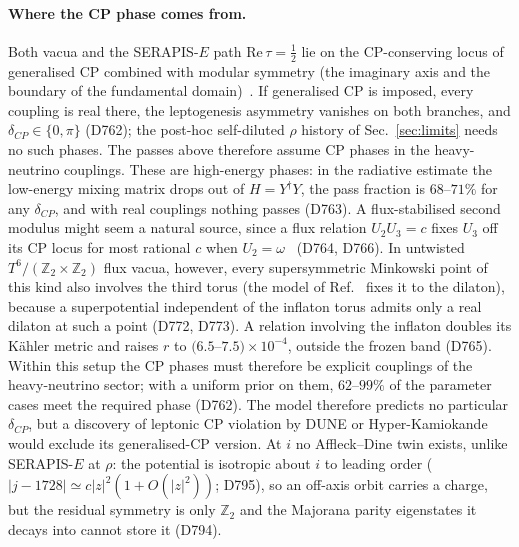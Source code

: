 \documentclass[aps,prd,twocolumn,superscriptaddress,nofootinbib,floatfix]{revtex4-2}
\begin{document}
\paragraph{Where the CP phase comes from.} Both vacua and the SERAPIS-$E$ path $\mathrm{Re}\,\tau=\tfrac12$ lie on the CP-conserving locus of generalised CP combined with modular symmetry (the imaginary axis and the boundary of the fundamental domain)~\cite{arXiv_1905_11970}. If generalised CP is imposed, every coupling is real there, the leptogenesis asymmetry vanishes on both branches, and $\delta_{CP}\in\{0,\pi\}$ (D762); the post-hoc self-diluted $\rho$ history of Sec.~\ref{sec:limits} needs no such phases. The passes above therefore assume CP phases in the heavy-neutrino couplings. These are high-energy phases: in the radiative estimate the low-energy mixing matrix drops out of $H=Y^\dagger Y$, the pass fraction is $68$--$71\%$ for any $\delta_{CP}$, and with real couplings nothing passes (D763). A flux-stabilised second modulus might seem a natural source, since a flux relation $U_2U_3=c$ fixes $U_3$ off its CP locus for most rational $c$ when $U_2=\omega$~\cite{arXiv_2405_18813} (D764, D766). In untwisted $T^6/(\mathbb{Z}_2\times\mathbb{Z}_2)$ flux vacua, however, every supersymmetric Minkowski point of this kind also involves the third torus (the model of Ref.~\cite{arXiv_2405_18813} fixes it to the dilaton), because a superpotential independent of the inflaton torus admits only a real dilaton at such a point (D772, D773). A relation involving the inflaton doubles its K\"ahler metric and raises $r$ to $(6.5$--$7.5)\times10^{-4}$, outside the frozen band (D765). Within this setup the CP phases must therefore be explicit couplings of the heavy-neutrino sector; with a uniform prior on them, $62$--$99\%$ of the parameter cases meet the required phase (D762). The model therefore predicts no particular $\delta_{CP}$, but a discovery of leptonic CP violation by DUNE or Hyper-Kamiokande would exclude its generalised-CP version. At $i$ no Affleck--Dine twin exists, unlike SERAPIS-$E$ at $\rho$: the potential is isotropic about $i$ to leading order ($|j-1728|\simeq c|z|^2(1+O(|z|^2))$; D795), so an off-axis orbit carries a charge, but the residual symmetry is only $\mathbb{Z}_2$ and the Majorana parity eigenstates it decays into cannot store it (D794).
\end{document}
